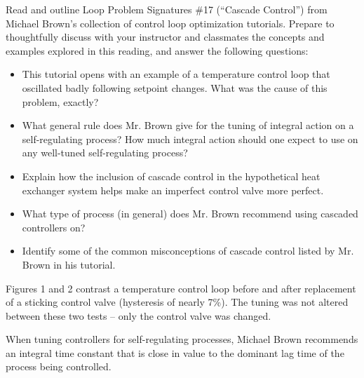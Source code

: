 

Read and outline Loop Problem Signatures \#17 (``Cascade Control'') from Michael Brown's collection of control loop optimization tutorials.  Prepare to thoughtfully discuss with your instructor and classmates the concepts and examples explored in this reading, and answer the following questions:

\begin{itemize}
\item{} This tutorial opens with an example of a temperature control loop that oscillated badly following setpoint changes.  What was the cause of this problem, exactly?
\vskip 10pt
\item{} What general rule does Mr. Brown give for the tuning of integral action on a self-regulating process?  How much integral action should one expect to use on any well-tuned self-regulating process?
\vskip 10pt
\item{} Explain how the inclusion of cascade control in the hypothetical heat exchanger system helps make an imperfect control valve more perfect.
\vskip 10pt
\item{} What type of process (in general) does Mr. Brown recommend using cascaded controllers on?
\vskip 10pt
\item{} Identify some of the common misconceptions of cascade control listed by Mr. Brown in his tutorial.
\end{itemize}














Figures 1 and 2 contrast a temperature control loop before and after replacement of a sticking control valve (hysteresis of nearly 7\%).  The tuning was not altered between these two tests -- only the control valve was changed.

\vskip 10pt

When tuning controllers for self-regulating processes, Michael Brown recommends an integral time constant that is close in value to the dominant lag time of the process being controlled.

